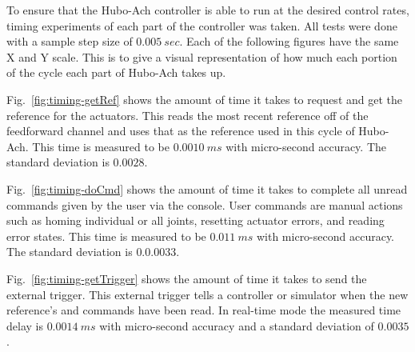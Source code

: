 
To ensure that the Hubo-Ach controller is able to run at the desired control rates, timing experiments of each part of the controller was taken.
All tests were done with a sample step size of $0.005~sec$.
Each of the following figures have the same X and Y scale.
This is to give a visual representation of how much each portion of the cycle each part of Hubo-Ach takes up.




Fig.~\ref{fig:timing-getRef} shows the amount of time it takes to request and get the reference for the actuators.
This reads the most recent reference off of the feedforward channel and uses that as the reference used in this cycle of Hubo-Ach.
This time is measured to be $0.0010~ms$ with micro-second accuracy.
The standard deviation is $0.0028$.



Fig.~\ref{fig:timing-doCmd} shows the amount of time it takes to complete all unread commands given by the user via the console.
User commands are manual actions such as homing individual or all joints, resetting actuator errors, and reading error states.
This time is measured to be $0.011~ms$ with micro-second accuracy.
The standard deviation is $0.0.0033$.


Fig.~\ref{fig:timing-getTrigger} shows the amount of time it takes to send the external trigger.  
This external trigger tells a controller or simulator when the new reference's and commands have been read.
In real-time mode the measured time delay is $0.0014~ms$ with micro-second accuracy and a standard deviation of $0.0035$.


